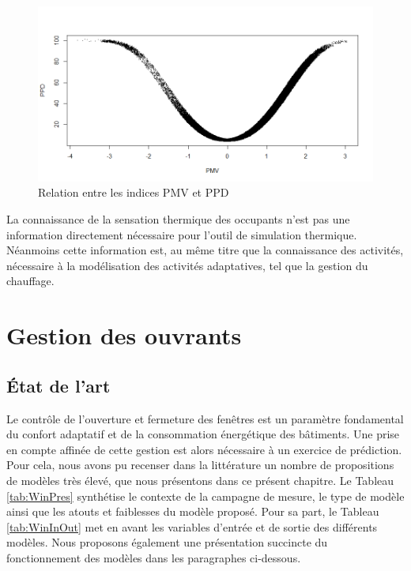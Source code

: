 \begin{figure}[H]
\centering
\includegraphics[scale=0.52]{Images/GainsMetPMVPPD/PMVvsPPD}
\caption{Relation entre les indices PMV et PPD}
\label{fig:PMVvsPPD}
\end{figure}

La connaissance de la sensation thermique des occupants n'est pas une information directement nécessaire pour l'outil de simulation thermique. Néanmoins cette information est, au même titre que la connaissance des activités, nécessaire à la modélisation des activités adaptatives, tel que la gestion du chauffage.

\section{Gestion des ouvrants}

\subsection{État de l'art}

Le contrôle de l'ouverture et fermeture des fenêtres est un paramètre fondamental du confort adaptatif et de la consommation énergétique des bâtiments. Une prise en compte affinée de cette gestion est alors nécessaire à un exercice de prédiction. Pour cela, nous avons pu recenser dans la littérature un nombre de propositions de modèles très élevé, que nous présentons dans ce présent chapitre. Le Tableau \ref{tab:WinPres} synthétise le contexte de la campagne de mesure, le type de modèle ainsi que les atouts et faiblesses du modèle proposé. Pour sa part, le Tableau \ref{tab:WinInOut} met en avant les variables d'entrée et de sortie des différents modèles. Nous proposons également une présentation succincte du fonctionnement des modèles dans les paragraphes ci-dessous.

